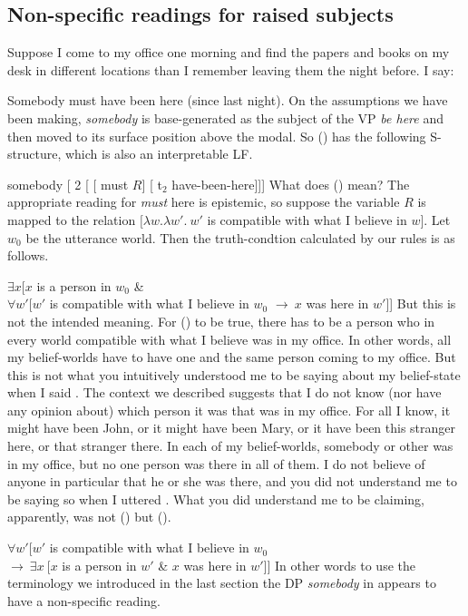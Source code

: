 \subsection{Non-specific readings for raised subjects}

Suppose I come to my office one morning and find the papers and books on my desk
in different locations than I remember leaving them the night before. I say:

\ex \label{some} Somebody must have been here (since last night).\xe
%
On the assumptions we have been making, \emph{somebody} is base-generated as the
subject of the VP \emph{be here} and then moved to its surface position above
the modal. So (\lastx) has the following S-structure, which is also an
interpretable LF.

\ex \label{dere} somebody [ 2 [ [ must $R$] [ t$_2$ have-been-here]]] \xe
%
What does (\lastx) mean? The appropriate reading for \emph{must} here is
epistemic, so suppose the variable $R$ is mapped to the relation $\bigl[\lambda
w.\lambda w'.\ w'$ is compatible with what I believe in $w\bigr]$. Let $w_{0}$
be the utterance world. Then the truth-condtion calculated by our rules is as
follows.

\ex $\exists x [x$ is a person in $w_{0}$ \& \\
$\forall w'[w'$ is compatible with what I believe in $w_{0}$ $\rightarrow\ x$ was here in $w'$]] \xe
%
But this is not the intended meaning. For (\lastx) to be true, there has to be a
person who in every world compatible with what I believe was in my office. In
other words, all my belief-worlds have to have one and the same person coming to
my office. But this is not what you intuitively understood me to be saying about
my belief-state when I said . The context we described suggests that I
do not know (nor have any opinion about) which person it was that was in my
office. For all I know, it might have been John, or it might have been Mary, or
it have been this stranger here, or that stranger there. In each of my
belief-worlds, somebody or other was in my office, but no one person was there
in all of them. I do not believe of anyone in particular that he or she was
there, and you did not understand me to be saying so when I uttered .
What you did understand me to be claiming, apparently, was not (\lastx) but
(\nextx).

\ex \label{dedic} $\forall w' [ w'$ is compatible with what I believe in $w_{0}$\\
\null\hfill$\rightarrow\ \exists x\ [x$ is a person in $w'$ \& $x$ was here in $w']]$ \xe
%
In other words \dash to use the terminology we introduced in the last section
\dash the DP \emph{somebody} in  appears to have a non-specific
reading.

